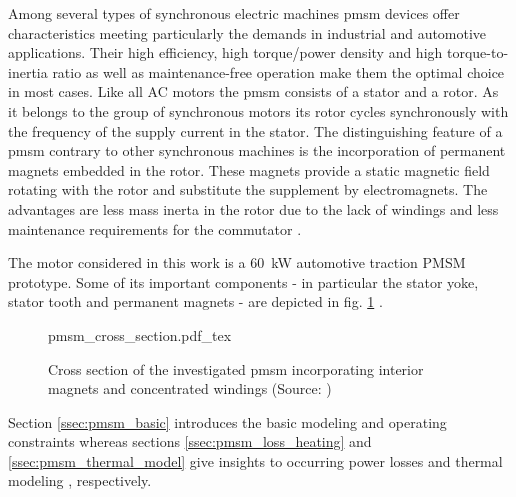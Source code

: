 Among several types of synchronous electric machines \gls{pmsm} devices offer characteristics meeting particularly the demands in industrial and automotive applications.
Their  high efficiency,  high torque/power density and high torque-to-inertia ratio as well as maintenance-free operation make them the optimal choice in most cases.
Like all AC motors the \gls{pmsm} consists of a stator and a rotor.
As it belongs to the group of synchronous motors its rotor cycles synchronously with the frequency of the supply current in the stator.
The distinguishing feature of a \gls{pmsm} contrary to other synchronous machines is the incorporation of permanent magnets embedded in the rotor.
These magnets provide a static magnetic field rotating with the rotor and substitute the supplement by electromagnets.
The advantages are less mass inerta in the rotor due to the lack of windings and less maintenance requirements for the commutator \cite{LeVa2014, Schroeder2007}.

The motor considered in this work is a \SI{60}{kW} automotive traction PMSM prototype.
Some of its important components - in particular the stator yoke, stator tooth and permanent magnets - are depicted in fig. \ref{fig:pmsm_cross_section} \cite{WaBo2016}.
\begin{figure}
	\centering
	\def\svgwidth{0.6\columnwidth}
         {pmsm_cross_section.pdf_tex}
         \caption{Cross section of the investigated \gls{pmsm} incorporating interior magnets and concentrated windings (Source: \cite{WaBo2016})}
	\label{fig:pmsm_cross_section}
\end{figure}

Section \ref{ssec:pmsm_basic} introduces the basic modeling and operating constraints \cite{LeVa2014, Schroeder2007} whereas sections \ref{ssec:pmsm_loss_heating} and \ref{ssec:pmsm_thermal_model} give insights to occurring power losses \cite{Kylander1995, Roberts1986, Schroeder2007} and thermal modeling \cite{ BoCa2009, LeVa2014, MeRo1991, WaBo2016}, respectively.

